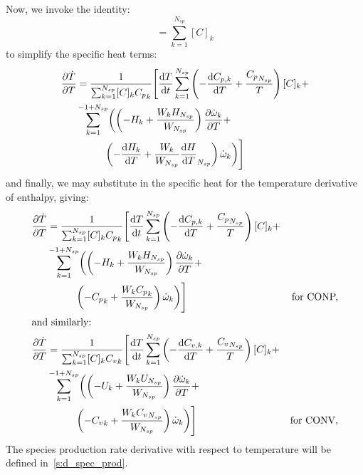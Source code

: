 \documentclass[12pt,number,sort&compress]{elsarticle}
\newcommand{\ns}{N_{sp}}
\newcommand{\conp}{CONP}
\newcommand{\conv}{CONV}
\newcommand{\dconp}{\ifmmode\text{for \conp,}\else for \conp,\fi}
\newcommand{\dconv}{\ifmmode\text{for \conv,}\else for \conv,\fi}
\begin{document}
Now, we invoke the identity:
\begin{equation}
 [C] = \sum_{k=1}^{\ns} [C]_{k}
\end{equation}
to simplify the specific heat terms:
\begin{align}
 \frac{\partial\dot{T}}{\partial{T}} &= \frac{1}{\sum_{k=1}^{\ns} [C]_{k} {C_p}_{k}} \Biggl[ \frac{\text{d} T }{\text{d} t } \sum_{k=1}^{\ns} \left(- \frac{\text{d} C_{p, k} }{\text{d} T } + \frac{{C_p}_{\ns}}{T}\right) [C]_{k} + \nonumber \\
				     & \sum_{k=1}^{-1 + \ns} \biggl(\left(- H_{k} + \frac{W_{k} H_{\ns}}{W_{\ns}}\right) \frac{\partial \dot{\omega}_{k} }{\partial T } + \nonumber \\
				     & \mathindent[larger] \left(- \frac{\text{d} H_{k} }{\text{d} T } + \frac{W_{k}}{W_{\ns}} \frac{\text{d} H }{\text{d} T }_{\ns}\right) \dot{\omega}_{k}\biggr)\Biggr]
\end{align}
and finally, we may substitute in the specific heat for the temperature derivative of enthalpy, giving:
\begin{subequations}
\label{e:dTdotdT_nojac}
\begin{align}
 \frac{\partial\dot{T}}{\partial{T}} &= \frac{1}{\sum_{k=1}^{\ns} [C]_{k} {C_p}_{k}} \Biggl[ \frac{\text{d} T }{\text{d} t } \sum_{k=1}^{\ns} \left(- \frac{\text{d} C_{p, k} }{\text{d} T } + \frac{{C_p}_{\ns}}{T}\right) [C]_{k} + & \nonumber \\
				     & \sum_{k=1}^{-1 + \ns} \biggl( \left(- H_{k} + \frac{W_{k} H_{\ns}}{W_{\ns}}\right) \frac{\partial \dot{\omega}_{k} }{\partial T } + & \nonumber \\
				     & \mathindent[larger] \left(- {C_p}_{k} + \frac{W_{k} {C_p}_{k} }{W_{\ns}} \right) \dot{\omega}_{k}\biggr)\Biggr] & \text{\dconp} \\
\intertext{and similarly:}
\frac{\partial\dot{T}}{\partial{T}}  &= \frac{1}{\sum_{k=1}^{\ns} [C]_{k} {C_v}_{k}} \Biggl[ \frac{\text{d} T }{\text{d} t } \sum_{k=1}^{\ns} \left(- \frac{\text{d} C_{v, k} }{\text{d} T } + \frac{{C_v}_{\ns}}{T}\right) [C]_{k} + & \nonumber \\
				     & \sum_{k=1}^{-1 + \ns} \biggl(\left(- U_{k} + \frac{W_{k} U_{\ns}}{W_{\ns}}\right) \frac{\partial \dot{\omega}_{k} }{\partial T } + & \nonumber \\
				     & \mathindent[larger] \left(- {C_v}_{k} + \frac{W_{k} {C_v}_{\ns}}{W_{\ns}}\right) \dot{\omega}_{k}\biggr)\Biggr] & \text{\dconv}
\end{align}
\end{subequations}
The species production rate derivative with respect to temperature will be defined in~\cref{s:d_spec_prod}.
\end{document}
